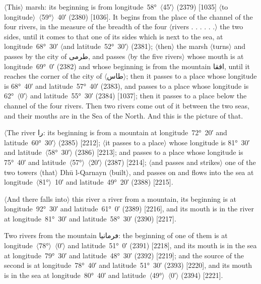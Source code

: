 \documentclass[11pt]{article}
\newcommand{\Pg}[1]{\marginpar{\footnotesize #1}}
\newcommand{\Ang}[1]{\ensuremath{#1}}
\begin{document}
\Ang{\langle}This\Ang{\rangle} marsh: its beginning is from longitude~58°~\Ang{\langle}45′\Ang{\rangle} (2379) [1035] \Ang{\langle}to longitude\Ang{\rangle}~\Ang{\langle}59°\Ang{\rangle}~40′ (2380) [1036]\Pg{p. 157}. It begins from the place of the channel of the four rivers, in the measure of the breadth of the four \Ang{\langle}rivers . . . . . .\Ang{\rangle} the two sides, until it comes to that one of its sides which is next to the sea, at longitude~68°~30′ \Ang{\langle}and latitude~52°~30′\Ang{\rangle} (2381); \Ang{\langle}then\Ang{\rangle} the marsh \Ang{\langle}turns\Ang{\rangle} and passes by the city of \textarabic{طرمى}, and passes \Ang{\langle}by the five rivers\Ang{\rangle} whose mouth is at longitude~69°~0′ (2382) and whose beginning is from the mountain \textarabic{افقا}, until it reaches the corner of the city of \Ang{\langle}\textarabic{طاس}\Ang{\rangle}; then it passes to a place whose longitude is 68°~40′ and latitude~57°~40′ (2383), and passes to a place whose longitude is 62°~\Ang{\langle}0′\Ang{\rangle} and latitude~55°~30′ (2384) [1037]; then it passes to a place below the channel of the four rivers. Then two rivers come out of it between the two seas, and their mouths are in the Sea of the North. And this is the picture of that.

\Ang{\langle}The river \textarabic{را}: its beginning is from a mountain at longitude~72°~20′ and latitude~60°~30′\Ang{\rangle} (2385) [2212]; \Ang{\langle}it passes to a place\Ang{\rangle} whose longitude is 81°~30′ and latitude~\Ang{\langle}58°~30′\Ang{\rangle} (2386) [2213]; and passes to a place whose longitude is 75°~40′ and latitude~\Ang{\langle}57°\Ang{\rangle}~\Ang{\langle}20′\Ang{\rangle} (2387) [2214]; \Ang{\langle}and passes and strikes\Ang{\rangle} one of the two towers \Ang{\langle}that\Ang{\rangle} Dhū l-Qarnayn \Ang{\langle}built\Ang{\rangle}, and passes on and flows into the sea at longitude~\Ang{\langle}81°\Ang{\rangle}~10′ and latitude~49°~20′ (2388) [2215].

\Ang{\langle}And there falls into\Ang{\rangle} this river a river from a mountain, its beginning is at longitude~92°~30′ and latitude~61°~0′ (2389) [2216], and its mouth is in the river at longitude~81°~30′ and latitude~58°~30′ (2390) [2217].

\Pg{p. 158}Two rivers from the mountain \textarabic{ڡرمانيا}: the beginning of one of them is at longitude~\Ang{\langle}78°\Ang{\rangle}~\Ang{\langle}0′\Ang{\rangle} and latitude~51°~0′ (2391) [2218], and its mouth is in the sea at longitude~79°~30′ and latitude~48°~30′ (2392) [2219]; and the source of the second is at longitude~78°~40′ and latitude~51°~30′ (2393) [2220], and its mouth is in the sea at longitude~80°~40′ and latitude~\Ang{\langle}49°\Ang{\rangle}~\Ang{\langle}0′\Ang{\rangle} (2394) [2221].
\end{document}
